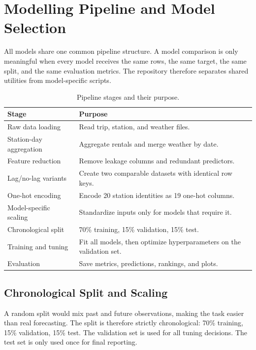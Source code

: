 \section{Modelling Pipeline and Model Selection}
\label{sec:pipeline}

All models share one common pipeline structure. A model comparison is 
only meaningful when every model receives the same rows, the same target, 
the same split, and the same evaluation metrics. The repository therefore 
separates shared utilities from model-specific scripts.

\begin{table}[htbp]
\caption{Pipeline stages and their purpose.}
\label{tab:pipeline}
\centering
\scriptsize
\begin{tabularx}{\columnwidth}{p{} X}
\toprule
\textbf{Stage} & \textbf{Purpose} \\
\midrule
Raw data loading & 
Read trip, station, and weather files. \\
\addlinespace
Station-day aggregation & 
Aggregate rentals and merge weather by date. \\
\addlinespace
Feature reduction & 
Remove leakage columns and redundant predictors. \\
\addlinespace
Lag/no-lag variants & 
Create two comparable datasets with identical row keys. \\
\addlinespace
One-hot encoding & 
Encode 20 station identities as 19 one-hot columns. \\
\addlinespace
Model-specific scaling & 
Standardize inputs only for models that require it. \\
\addlinespace
Chronological split & 
70\% training, 15\% validation, 15\% test. \\
\addlinespace
Training and tuning & 
Fit all models, then optimize hyperparameters on 
the validation set. \\
\addlinespace
Evaluation & 
Save metrics, predictions, rankings, and plots. \\
\bottomrule
\end{tabularx}
\end{table}

\subsection{Chronological Split and Scaling}

A random split would mix past and future observations, making the task 
easier than real forecasting. The split is therefore strictly 
chronological: 70\% training, 15\% validation, 15\% test. The 
validation set is used for all tuning decisions. The test set is 
only used once for final reporting.

